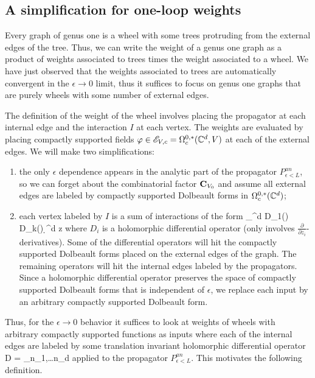 \documentclass[10pt]{amsart}
\begin{document}
\subsection{A simplification for one-loop weights}

Every graph of genus one is a wheel with some trees protruding from the external edges of the tree.
Thus, we can write the weight of a genus one graph as a product of weights associated to trees times the weight associated to a wheel.
We have just observed that the weights associated to trees are automatically convergent in the $\epsilon \to 0$ limit, thus it suffices to focus on genus one graphs that are purely wheels with some number of external edges.

The definition of the weight of the wheel involves placing the propagator at each internal edge and the interaction $I$ at each vertex. 
The weights are evaluated by placing compactly supported fields $\varphi \in \mathscr E_{V,c} = \Omega^{0,*}_c(\mathbb C^d, V)$ at each of the external edges.
We will make two simplifications:
\begin{enumerate}
\item the only $\epsilon$ dependence appears in the analytic part of the propagator $P_{\epsilon<L}^{an}$, so we can forget about the combinatorial factor ${\bf C}_{V_0}$ and assume all external edges are labeled by compactly supported Dolbeault forms in $\Omega^{0,*}_c(\mathbb C^d)$;
\item each vertex labeled by $I$ is a sum of interactions of the form
\ben
\int_{\CC^d} D_1(\varphi) \cdots D_k(\varphi) \d^d z
\een
where $D_i$ is a holomorphic differential operator (only involves $\frac{\partial}{\partial z_i}$-derivatives). 
Some of the differential operators will hit the compactly supported Dolbeault forms placed on the external edges of the graph.
The remaining operators will hit the internal edges labeled by the propagators.
Since a holomorphic differential operator preserves the space of compactly supported Dolbeault forms that is independent of $\epsilon$, we replace each input by an arbitrary compactly supported Dolbeault form.
\end{enumerate}

Thus, for the $\epsilon \to 0$ behavior it suffices to look at weights of wheels with arbitrary compactly supported functions as inputs where each of the internal edges are labeled by some translation invariant holomorphic differential operator 
\ben
D = \sum_{n_1,\ldots n_d} \cdots {}
\een
applied to the propagator $P_{\epsilon<L}^{an}$.
This motivates the following definition. 
\end{document}
